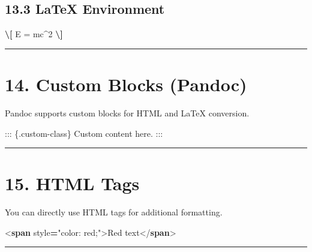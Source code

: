 \documentclass[
]{book}
\newenvironment{Shaded}{\begin{snugshade}}{\end{snugshade}}
\newcommand{\DataTypeTok}[1]{\textcolor[rgb]{0.13,0.29,0.53}{#1}}
\newcommand{\KeywordTok}[1]{\textcolor[rgb]{0.13,0.29,0.53}{\textbf{#1}}}
\newcommand{\NormalTok}[1]{#1}
\newcommand{\OperatorTok}[1]{\textcolor[rgb]{0.81,0.36,0.00}{\textbf{#1}}}
\newcommand{\OtherTok}[1]{\textcolor[rgb]{0.56,0.35,0.01}{#1}}
\newcommand{\SpecialCharTok}[1]{\textcolor[rgb]{0.81,0.36,0.00}{\textbf{#1}}}
\newcommand{\StringTok}[1]{\textcolor[rgb]{0.31,0.60,0.02}{#1}}
\theoremstyle{definition}
\theoremstyle{definition}
\theoremstyle{definition}
\theoremstyle{definition}
\theoremstyle{remark}
\begin{document}
\subsection{13.3 LaTeX Environment}\label{latex-environment}

\begin{Shaded}
\begin{Highlighting}[]
\SpecialCharTok{\textbackslash{}[}
\NormalTok{E = mc\^{}2}
\SpecialCharTok{\textbackslash{}]}
\end{Highlighting}
\end{Shaded}

\begin{center}\rule{0.5\linewidth}{0.5pt}\end{center}

\section{14. Custom Blocks (Pandoc)}\label{custom-blocks-pandoc}

Pandoc supports custom blocks for HTML and LaTeX conversion.

\begin{Shaded}
\begin{Highlighting}[]
\NormalTok{::: \{.custom{-}class\}}
\NormalTok{Custom content here.}
\NormalTok{:::}
\end{Highlighting}
\end{Shaded}

\begin{center}\rule{0.5\linewidth}{0.5pt}\end{center}

\section{15. HTML Tags}\label{html-tags}

You can directly use HTML tags for additional formatting.

\begin{Shaded}
\begin{Highlighting}[]
\DataTypeTok{\textless{}}\KeywordTok{span}\OtherTok{ style}\OperatorTok{=}\StringTok{"color: red;"}\DataTypeTok{\textgreater{}}\NormalTok{Red text}\DataTypeTok{\textless{}/}\KeywordTok{span}\DataTypeTok{\textgreater{}}
\end{Highlighting}
\end{Shaded}

\begin{center}\rule{0.5\linewidth}{0.5pt}\end{center}
\end{document}
